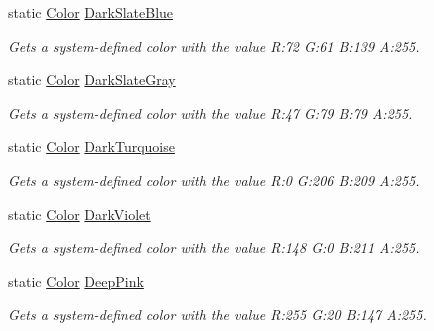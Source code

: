 \begin{DoxyCompactItemize}
static \hyperlink{struct_microsoft_1_1_xna_1_1_framework_1_1_color}{Color} \hyperlink{struct_microsoft_1_1_xna_1_1_framework_1_1_color_af65910d87ae1b5cc3662ffd113ebbf79}{Dark\+Slate\+Blue}
\begin{DoxyCompactList}\small\item\em Gets a system-\/defined color with the value R\+:72 G\+:61 B\+:139 A\+:255.\end{DoxyCompactList}\item 
static \hyperlink{struct_microsoft_1_1_xna_1_1_framework_1_1_color}{Color} \hyperlink{struct_microsoft_1_1_xna_1_1_framework_1_1_color_a70575bd17b8616c1006d72397dd82f12}{Dark\+Slate\+Gray}
\begin{DoxyCompactList}\small\item\em Gets a system-\/defined color with the value R\+:47 G\+:79 B\+:79 A\+:255.\end{DoxyCompactList}\item 
static \hyperlink{struct_microsoft_1_1_xna_1_1_framework_1_1_color}{Color} \hyperlink{struct_microsoft_1_1_xna_1_1_framework_1_1_color_aa39f1057eff99f537b7097551e336e02}{Dark\+Turquoise}
\begin{DoxyCompactList}\small\item\em Gets a system-\/defined color with the value R\+:0 G\+:206 B\+:209 A\+:255.\end{DoxyCompactList}\item 
static \hyperlink{struct_microsoft_1_1_xna_1_1_framework_1_1_color}{Color} \hyperlink{struct_microsoft_1_1_xna_1_1_framework_1_1_color_ab2863b2d0fde2d223228de4ca57b9b7f}{Dark\+Violet}
\begin{DoxyCompactList}\small\item\em Gets a system-\/defined color with the value R\+:148 G\+:0 B\+:211 A\+:255.\end{DoxyCompactList}\item 
static \hyperlink{struct_microsoft_1_1_xna_1_1_framework_1_1_color}{Color} \hyperlink{struct_microsoft_1_1_xna_1_1_framework_1_1_color_acf2ac4b483d240eba6d132e9d64c6fe6}{Deep\+Pink}
\begin{DoxyCompactList}\small\item\em Gets a system-\/defined color with the value R\+:255 G\+:20 B\+:147 A\+:255.\end{DoxyCompactList}\item 

\end{DoxyCompactItemize}
